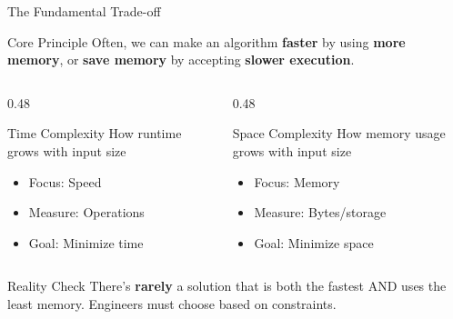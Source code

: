 \documentclass[aspectratio=169,xcolor=dvipsnames]{beamer}
\begin{document}
\begin{frame}{The Fundamental Trade-off}
  \begin{block}{Core Principle}
    Often, we can make an algorithm \textbf{faster} by using \textbf{more memory}, or \textbf{save memory} by accepting \textbf{slower execution}.
  \end{block}

  \vspace{0.3cm}

  \begin{columns}
    \begin{column}{0.48\textwidth}
      \begin{exampleblock}{Time Complexity}
        How runtime grows with input size
        \begin{itemize}
          \item Focus: Speed
          \item Measure: Operations
          \item Goal: Minimize time
        \end{itemize}
      \end{exampleblock}
    \end{column}
    \begin{column}{0.48\textwidth}
      \begin{exampleblock}{Space Complexity}
        How memory usage grows with input size
        \begin{itemize}
          \item Focus: Memory
          \item Measure: Bytes/storage
          \item Goal: Minimize space
        \end{itemize}
      \end{exampleblock}
    \end{column}
  \end{columns}

  \vspace{0.5cm}

  \begin{alertblock}{Reality Check}
    There's \textbf{rarely} a solution that is both the fastest AND uses the least memory. Engineers must choose based on constraints.
  \end{alertblock}
\end{frame}
\end{document}
